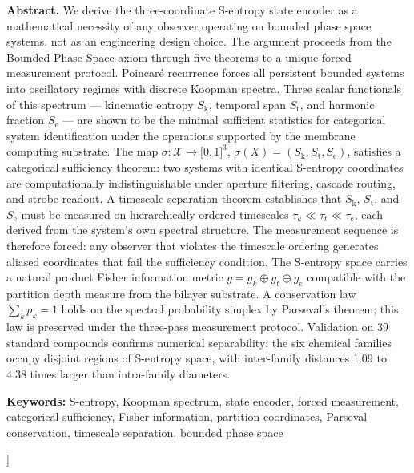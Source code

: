 \documentclass[11pt,twocolumn,a4paper]{article}
\theoremstyle{definition}
\theoremstyle{remark}
\newcommand{\Sk}{S_{\mathrm{k}}}
\newcommand{\St}{S_{\mathrm{t}}}
\newcommand{\Se}{S_{\mathrm{e}}}
\begin{document}
\begin{@twocolumnfalse}
\begin{center}
\begin{minipage}{0.92\textwidth}
\textbf{Abstract.}
We derive the three-coordinate S-entropy state encoder as a mathematical necessity
of any observer operating on bounded phase space systems, not as an engineering
design choice. The argument proceeds from the Bounded Phase Space axiom through
five theorems to a unique forced measurement protocol. Poincar\'{e} recurrence
forces all persistent bounded systems into oscillatory regimes with discrete
Koopman spectra. Three scalar functionals of this spectrum --- kinematic entropy
$\Sk$, temporal span $\St$, and harmonic fraction $\Se$ --- are shown to be the
minimal sufficient statistics for categorical system identification under the
operations supported by the membrane computing substrate. The map
$\sigma\colon \mathcal{X} \to \lbrack 0,1\rbrack^3$, $\sigma(X) = (\Sk, \St, \Se)$, satisfies
a categorical sufficiency theorem: two systems with identical S-entropy coordinates
are computationally indistinguishable under aperture filtering, cascade routing,
and strobe readout. A timescale separation theorem establishes that $\Sk$, $\St$,
and $\Se$ must be measured on hierarchically ordered timescales
$\tau_k \ll \tau_t \ll \tau_e$, each derived from the system's own spectral
structure. The measurement sequence is therefore forced: any observer that violates
the timescale ordering generates aliased coordinates that fail the sufficiency
condition. The S-entropy space carries a natural product Fisher information metric
$g = g_k \oplus g_t \oplus g_e$ compatible with the partition depth measure from
the bilayer substrate. A conservation law $\sum_k p_k = 1$ holds on the spectral
probability simplex by Parseval's theorem; this law is preserved under the
three-pass measurement protocol. Validation on 39 standard compounds confirms
numerical separability: the six chemical families occupy disjoint regions of
S-entropy space, with inter-family distances 1.09 to 4.38 times larger than
intra-family diameters.
\end{minipage}

\vspace{8pt}
\noindent\textbf{Keywords:}
S-entropy, Koopman spectrum, state encoder, forced measurement, categorical
sufficiency, Fisher information, partition coordinates, Parseval conservation,
timescale separation, bounded phase space

\vspace{18pt}
\end{center}
\end{@twocolumnfalse}
]
\end{document}

